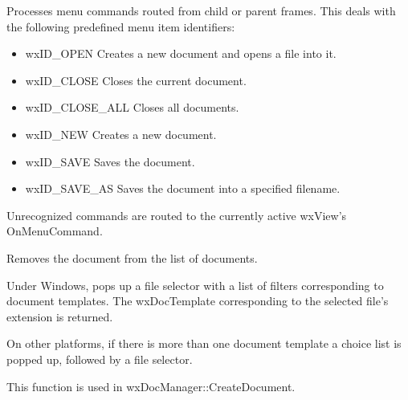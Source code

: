 Processes menu commands routed from child or parent frames. This deals
with the following predefined menu item identifiers:

\begin{itemize}\itemsep=0pt
\item wxID\_OPEN Creates a new document and opens a file into it.
\item wxID\_CLOSE Closes the current document.
\item wxID\_CLOSE\_ALL Closes all documents.
\item wxID\_NEW Creates a new document.
\item wxID\_SAVE Saves the document.
\item wxID\_SAVE\_AS Saves the document into a specified filename.
\end{itemize}

Unrecognized commands are routed to the currently active wxView's OnMenuCommand.



Removes the document from the list of documents.



Under Windows, pops up a file selector with a list of filters corresponding to document templates.
The wxDocTemplate corresponding to the selected file's extension is returned.

On other platforms, if there is more than one document template a choice list is popped up,
followed by a file selector.

This function is used in wxDocManager::CreateDocument.




